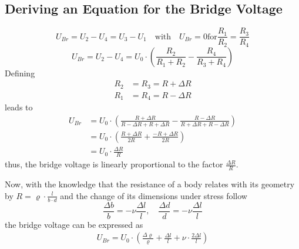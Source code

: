         \subsection{Deriving an Equation for the Bridge Voltage}\label{sec:A4 equation for full bridge circuit}%
            \begin{equation}
                U_{Br} = U_2 - U_4 = U_3 - U_1 \quad \text{with} \quad U_{Br} = 0 \text{for} \frac{R_1}{R_2} = \frac{R_3}{R_4}
            \end{equation}
            \begin{equation}
                U_{Br} = U_2 - U_4 = U_0 \cdot \left(\frac{R_2}{R_1 + R_2} - \frac{R_4}{R_3 + R_4}\right)
            \end{equation}
            Defining
            \begin{align}
                R_2 &= R_3 = R + \Delta R \\
                R_1 &= R_4 = R - \Delta R
            \end{align}
            leads to
            \begin{align}
                U_{Br}  &= U_0 \cdot \left(\frac{R + \Delta R}{R - \Delta R + R + \Delta R} - \frac{R - \Delta R}{R + \Delta R + R - \Delta R}\right) \nonumber \\
                        &= U_0 \cdot \left(\frac{R+\Delta R}{2R} + \frac{-R + \Delta R}{2R}\right) \nonumber \\
                        &= U_0 \cdot \frac{\Delta R}{R}
                \label{eq:Ubr and delta R}
            \end{align}
            thus, the bridge voltage is linearly proportional to the factor \( \frac{\Delta R}{R} \).\par
            Now, with the knowledge that the resistance of a body relates with its geometry by
            \( R = \varrho \cdot \frac{l}{b \cdot d} \) and the change of its dimensions under stress follow
            \begin{equation}
                \frac{\Delta b}{b} = -\nu \frac{\Delta l}{l}, \quad \frac{\Delta d}{d} = -\nu \frac{\Delta l}{l}
            \end{equation}
            the bridge voltage can be expressed as
            \begin{align}
                U_{Br} = U_0 \cdot \left( \frac{\Delta \varrho}{\varrho} + \frac{\Delta l}{l} + \nu \cdot \frac{2 \Delta l}{l}\right)
            \end{align}
